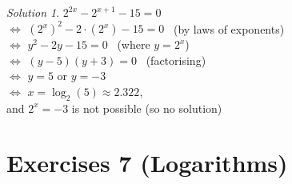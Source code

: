 \documentclass[
  12pt,
  oneside]{book}
\theoremstyle{definition}
\theoremstyle{definition}
\theoremstyle{definition}
\theoremstyle{definition}
\theoremstyle{remark}
\newtheorem*{solution}{Solution}
\begin{document}
\begin{solution}
\(2^{2x}-2^{x+1}-15=0\)\\
\(\iff\) \(\left(2^x\right)^2-2\cdot\left(2^x\right)-15=0\) \hfill~{(by laws of exponents)}\\
\(\iff\) \(y^2 -2y-15=0\) \hfill~{(where \(y=2^x\))}\\
\(\iff\) \((y-5)(y+3)=0\) \hfill~{(factorising)}\\
\(\iff\) \(y=5\) or \(y=-3\)\\
\(\iff\) \(x=\log_2(5)\approx 2.322\),\\
and \(2^x=-3\) is not possible (so no solution)
\end{solution}

\chapter*{Exercises 7 (Logarithms)}\label{exercises-7-logarithms}
\end{document}

